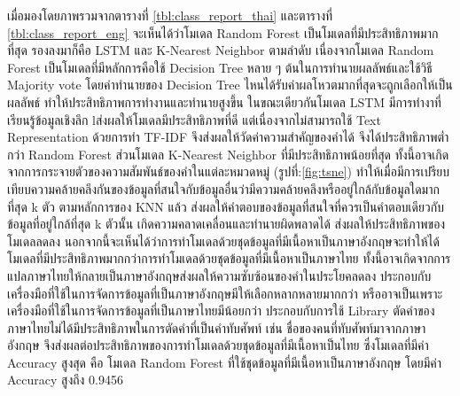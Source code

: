 \documentclass[12pt,oneside,openright,a4paper]{cpe-thai-project}
\begin{document}
      \hspace{1cm}เมื่อมองโดยภาพรวมจากตารางที่ \ref{tbl:class_report_thai} และตารางที่ \ref{tbl:class_report_eng} 
      จะเห็นได้ว่าโมเดล Random Forest เป็นโมเดลที่มีประสิทธิภาพมากที่สุด รองลงมาก็คือ LSTM และ K-Nearest Neighbor ตามลำดับ
      เนื่องจากโมเดล Random Forest เป็นโมเดลที่มีหลักการคือใช้ Decision Tree หลาย ๆ ต้นในการทำนายผลลัพธ์และใช้วิธี Majority vote 
      โดยค่าทำนายของ Decision Tree ไหนได้รับค่าผลโหวตมากที่สุดจะถูกเลือกให้เป็นผลลัพธ์ ทำให้ประสิทธิภาพการทำงานและทำนายสูงขึ้น
      ในขณะเดียวกันโมเดล LSTM มีการทำงาที่เรียนรู้ข้อมูลเชิงลึก lส่งผลให้โมเดลมีประสิทธิภาพที่ดี 
      แต่เนื่องจากไม่สามารถใช้ Text Representation ด้วยการทำ TF-IDF จึงส่งผลให้วัดค่าความสำคัญของคำได้ จึงได้ประสิทธิภาพต่ำกว่า Random Forest
      ส่วนโมเดล K-Nearest Neighbor ที่มีประสิทธิภาพน้อยที่สุด ทั้งนี้อาจเกิดจากการกระจายตัวของความสัมพันธ์ของคำในแต่ละหมวดหมู่ (รูปที่:\ref{fig:tsne}) 
      ทำให้เมื่อมีการเปรียบเทียบความคล้ายคลึงกันของข้อมูลที่สนใจกับข้อมูลอื่นว่ามีความคล้ายคลึงหรืออยู่ใกล้กับข้อมูลใดมากที่สุด k ตัว ตามหลักการของ KNN แล้ว
      ส่งผลให้คำตอบของข้อมูลที่สนใจที่ควรเป็นคำตอบเดียวกับข้อมูลที่อยู่ใกล้ที่สุด k ตัวนั้น เกิดความคลาดเคลื่อนและทำนายผิดพลาดได้ ส่งผลให้ประสิทธิภาพของโมเดลลดลง
      นอกจากนี้จะเห็นได้ว่าการทำโมเดลด้วยชุดข้อมูลที่มีเนื้อหาเป็นภาษาอังกฤษจะทำให้ได้โมเดลที่มีประสิทธิภาพมากกว่าการทำโมเดลด้วยชุดข้อมูลที่มีเนื้อหาเป็นภาษาไทย 
      ทั้งนี้อาจเกิดจากการแปลภาษาไทยให้กลายเป็นภาษาอังกฤษส่งผลให้ความซับซ้อนของคำในประโยคลดลง
      ประกอบกับเครื่องมือที่ใช้ในการจัดการข้อมูลที่เป็นภาษาอังกฤษมีให้เลือกหลากหลายมากกว่า 
      หรืออาจเป็นเพราะเครื่องมือที่ใช้ในการจัดการข้อมูลที่เป็นภาษาไทยมีน้อยกว่า
      ประกอบกับการใช้ Library ตัดคำของภาษาไทยไม่ได้มีประสิทธิภาพในการตัดคำที่เป็นคำทับศัพท์ เช่น ชื่อของคนที่ทับศัพท์มาจากภาษาอังกฤษ 
      จึงส่งผลต่อประสิทธิภาพของการทำโมเดลด้วยชุดข้อมูลที่มีเนื้อหาเป็นไทย 
      ซึ่งโมเดลที่มีค่า Accuracy สูงสุด คือ โมเดล Random Forest ที่ใช้ชุดข้อมูลที่มีเนื้อหาเป็นภาษาอังกฤษ โดยมีค่า Accuracy สูงถึง 0.9456
\end{document}
